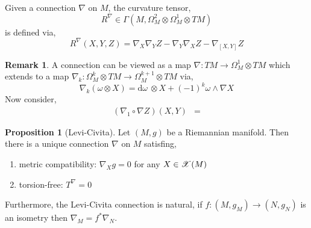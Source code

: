 \documentclass[12pt]{extarticle}
\renewcommand{\d}[1]{ \mathrm{d}#1 \:}
\theoremstyle{definition}
\newtheorem{proposition}[theorem]{Proposition}
\newtheorem{remark}{Remark}
\newenvironment{definition}[1][Definition:]{\begin{trivlist}
\item[\hskip \labelsep {\bfseries #1}]}{\end{trivlist}}
\begin{document}
\begin{definition}
Given a connection $\nabla$ on $M$, the curvature tensor,
\[ R^\nabla \in \Gamma(M, \Omega_M^2 \otimes \Omega_M^1 \otimes TM) \]
is defined via,
\[ R^\nabla(X, Y, Z) = \nabla_X \nabla_Y Z - \nabla_Y \nabla_X Z - \nabla_{[X, Y]} Z \]
\end{definition}

\begin{remark}
A connection can be viewed as a map $\nabla : TM \to \Omega_M^1 \otimes TM$ which extends to a map $\nabla_k : \Omega^k_M \otimes TM \to \Omega_M^{k+1} \otimes TM$ via,
\[ \nabla_k (\omega \otimes X) = \d{\omega} \otimes X + (-1)^k \omega \wedge \nabla X \]
Now consider,
\begin{align*}
(\nabla_1 \circ \nabla Z)(X, Y) & = 
\end{align*} 
\end{remark}

\begin{proposition}[Levi-Civita]
Let $(M, g)$ be a Riemannian manifold. Then there is a unique connection $\nabla$ on $M$ satisfing,
\begin{enumerate}
\item metric compatibility: $\nabla_X g = 0$ for any $X \in \mathscr{X}(M)$
\item torsion-free: $T^\nabla = 0$
\end{enumerate}
Furthermore, the Levi-Civita connection is natural, if $f : (M, g_M) \to (N, g_N)$ is an isometry then $\nabla_M = f^* \nabla_N$.
\end{proposition}
\end{document}
